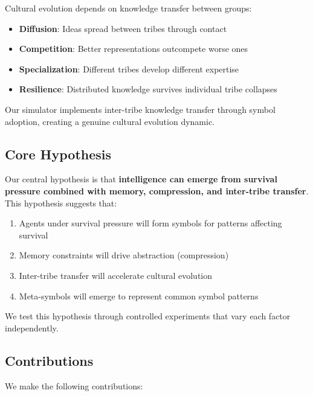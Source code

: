 \documentclass[11pt,a4paper]{article}
\begin{document}
Cultural evolution depends on knowledge transfer between groups:

\begin{itemize}
    \item \textbf{Diffusion}: Ideas spread between tribes through contact
    \item \textbf{Competition}: Better representations outcompete worse ones
    \item \textbf{Specialization}: Different tribes develop different expertise
    \item \textbf{Resilience}: Distributed knowledge survives individual tribe collapses
\end{itemize}

Our simulator implements inter-tribe knowledge transfer through symbol adoption, creating a genuine cultural evolution dynamic.

\subsection{Core Hypothesis}

Our central hypothesis is that \textbf{intelligence can emerge from survival pressure combined with memory, compression, and inter-tribe transfer}. This hypothesis suggests that:

\begin{enumerate}
    \item Agents under survival pressure will form symbols for patterns affecting survival
    \item Memory constraints will drive abstraction (compression)
    \item Inter-tribe transfer will accelerate cultural evolution
    \item Meta-symbols will emerge to represent common symbol patterns
\end{enumerate}

We test this hypothesis through controlled experiments that vary each factor independently.

\subsection{Contributions}

We make the following contributions:
\end{document}
